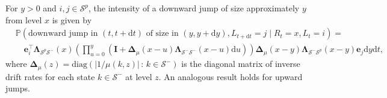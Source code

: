 \documentclass[10pt,a4paper]{amsart}
\newcommand{\dd}{\mathrm{d}}
\begin{document}
\begin{theorem}
\label{thm:jump_density_restructured}
For \(y > 0\) and \(i,j \in \mathcal{S}^p\), the intensity of a downward jump of size approximately \(y\) from level \(x\) is given by
\begin{align*}
&\mathbb{P}(\text{downward jump in }(t, t+\dd t)\text{ of size in }(y, y+\dd y), L_{t+\dd t}=j \mid R_t=x, L_t=i) = \\
&\quad \bm{e}_i^\intercal \bm{\Lambda}_{\mathcal{S}^p\mathcal{S}^-}(x) \left( \prod_{u=0}^y (\bm{I} + \bm{\Delta}_\mu(x-u)\bm{\Lambda}_{\mathcal{S}^-\mathcal{S}^-}(x-u)\dd u) \right) \bm{\Delta}_\mu(x-y)\bm{\Lambda}_{\mathcal{S}^-\mathcal{S}^p}(x-y) \bm{e}_j \dd y \dd t,
\end{align*}
where \(\bm{\Delta}_\mu(z) = \text{diag}(|1/\mu(k,z)|\,:\,k\in \mathcal{S}^-)\) is the diagonal matrix of inverse drift rates for each state \(k \in \mathcal{S}^-\) at level \(z\). An analogous result holds for upward jumps.
\end{theorem}
\end{document}
